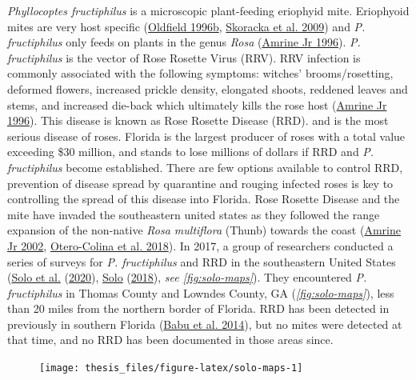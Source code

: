 \documentclass[12pt,final,CPage]{ufthesis}
\begin{document}
{  \emph{Phyllocoptes fructiphilus} is a microscopic plant-feeding eriophyid mite. Eriophyoid mites are very host specific (\protect\hyperlink{ref-Oldfield1996c}{Oldfield 1996b}, \protect\hyperlink{ref-Skoracka2009}{Skoracka et al. 2009}) and \emph{P. fructiphilus} only feeds on plants in the genus \emph{Rosa} (\protect\hyperlink{ref-Amrine1996}{Amrine Jr 1996}). \emph{P. fructiphilus} is the vector of Rose Rosette Virus (RRV). RRV infection is commonly associated with the following symptoms: witches' brooms/rosetting, deformed flowers, increased prickle density, elongated shoots, reddened leaves and stems, and increased die-back which ultimately kills the rose host (\protect\hyperlink{ref-Amrine1996}{Amrine Jr 1996}). This disease is known as Rose Rosette Disease (RRD). and is the most serious disease of roses. Florida is the largest producer of roses with a total value exceeding \$30 million, and stands to lose millions of dollars if RRD and \emph{P. fructiphilus} become established. There are few options available to control RRD, prevention of disease spread by quarantine and rouging infected roses is key to controlling the spread of this disease into Florida. Rose Rosette Disease and the mite have invaded the southeastern united states as they followed the range expansion of the non-native \emph{Rosa multiflora} (Thunb) towards the coast (\protect\hyperlink{ref-Amrine2002}{Amrine Jr 2002}, \protect\hyperlink{ref-Otero-Colina2018}{Otero-Colina et al. 2018}). In 2017, a group of researchers conducted a series of surveys for \emph{P. fructiphilus} and RRD in the southeastern United States (\protect\hyperlink{ref-Solo2020}{Solo et al.} (\protect\hyperlink{ref-Solo2020}{2020}), \protect\hyperlink{ref-Solo2018}{Solo} (\protect\hyperlink{ref-Solo2018}{2018}), \emph{see \ref{fig:solo-maps}}). They encountered \emph{P. fructiphilus} in Thomas County and Lowndes County, GA (\emph{\ref{fig:solo-maps}}), less than 20 miles from the northern border of Florida. RRD has been detected in previously in southern Florida (\protect\hyperlink{ref-Babu2014}{Babu et al. 2014}), but no mites were detected at that time, and no RRD has been documented in those areas since.
  \begin{figure}

  {\centering \texttt{[image: thesis\_files/figure-latex/solo-maps-1]} 

  }


\end{figure}}
\end{document}
